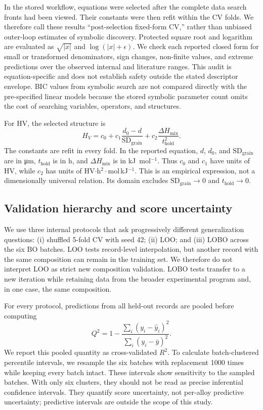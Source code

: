 \documentclass[5p,times,twocolumn]{elsarticle}
\begin{document}
In the stored workflow, equations were selected after the complete data search fronts had been viewed. Their constants were then refit within the CV folds. We therefore call these results ``post-selection fixed-form CV,'' rather than unbiased outer-loop estimates of symbolic discovery. Protected square root and logarithm are evaluated as $\sqrt{|x|}$ and $\log(|x|+\epsilon)$. We check each reported closed form for small or transformed denominators, sign changes, non-finite values, and extreme predictions over the observed internal and literature ranges. This audit is equation-specific and does not establish safety outside the stated descriptor envelope. BIC values from symbolic search are not compared directly with the pre-specified linear models because the stored symbolic parameter count omits the cost of searching variables, operators, and structures.

For HV, the selected structure is
\begin{equation}
H_V=c_0+c_1\frac{d_0-d}{\mathrm{SD}_{\mathrm{grain}}}
       +c_2\frac{\Delta H_{\mathrm{mix}}}{t_{\mathrm{hold}}^2}.
\label{eq:hvform}
\end{equation}
The constants are refit in every fold. In the reported equation, $d$, $d_0$, and $\mathrm{SD}_{\mathrm{grain}}$ are in \si{\micro\meter}, $t_{\mathrm{hold}}$ is in h, and $\Delta H_{\mathrm{mix}}$ is in kJ~mol$^{-1}$. Thus $c_0$ and $c_1$ have units of HV, while $c_2$ has units of HV$\cdot$h$^2\cdot$mol\,kJ$^{-1}$. This is an empirical expression, not a dimensionally universal relation. Its domain excludes $\mathrm{SD}_{\mathrm{grain}}\rightarrow0$ and $t_{\mathrm{hold}}\rightarrow0$.

\subsection{Validation hierarchy and score uncertainty}
\label{sec:validation}

We use three internal protocols that ask progressively different generalization questions: (i) shuffled 5-fold CV with seed 42; (ii) LOO; and (iii) LOBO across the six BO batches. LOO tests record-level interpolation, but another record with the same composition can remain in the training set. We therefore do not interpret LOO as strict new composition validation. LOBO tests transfer to a new iteration while retaining data from the broader experimental program and, in one case, the same composition.

For every protocol, predictions from all held-out records are pooled before computing
\begin{equation}
Q^2=1-\frac{\sum_i(y_i-\hat y_i)^2}{\sum_i(y_i-\bar y)^2}.
\end{equation}
We report this pooled quantity as cross-validated $R^2$. To calculate batch-clustered percentile intervals, we resample the six batches with replacement 1000 times while keeping every batch intact. These intervals show sensitivity to the sampled batches. With only six clusters, they should not be read as precise inferential confidence intervals. They quantify score uncertainty, not per-alloy predictive uncertainty; predictive intervals are outside the scope of this study.
\end{document}
